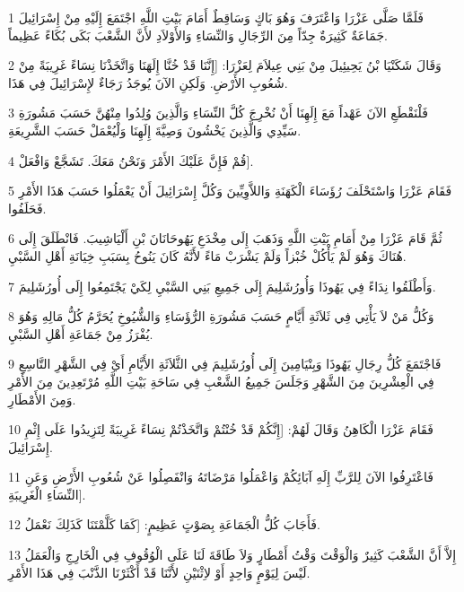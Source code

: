 \par 1 فَلَمَّا صَلَّى عَزْرَا وَاعْتَرَفَ وَهُوَ بَاكٍ وَسَاقِطٌ أَمَامَ بَيْتِ اللَّهِ اجْتَمَعَ إِلَيْهِ مِنْ إِسْرَائِيلَ جَمَاعَةٌ كَثِيرَةٌ جِدّاً مِنَ الرِّجَالِ وَالنِّسَاءِ وَالأَوْلاَدِ لأَنَّ الشَّعْبَ بَكَى بُكَاءً عَظِيماً.
\par 2 وَقَالَ شَكَنْيَا بْنُ يَحِيئِيلَ مِنْ بَنِي عِيلاَمَ لِعَزْرَا: [إِنَّنَا قَدْ خُنَّا إِلَهَنَا وَاتَّخَذْنَا نِسَاءً غَرِيبَةً مِنْ شُعُوبِ الأَرْضِ. وَلَكِنِ الآنَ يُوجَدُ رَجَاءٌ لإِسْرَائِيلَ فِي هَذَا.
\par 3 فَلْنَقْطَعِ الآنَ عَهْداً مَعَ إِلَهِنَا أَنْ نُخْرِجَ كُلَّ النِّسَاءِ وَالَّذِينَ وُلِدُوا مِنْهُنَّ حَسَبَ مَشُورَةِ سَيِّدِي وَالَّذِينَ يَخْشُونَ وَصِيَّةَ إِلَهِنَا وَلْيُعْمَلْ حَسَبَ الشَّرِيعَةِ.
\par 4 قُمْ فَإِنَّ عَلَيْكَ الأَمْرَ وَنَحْنُ مَعَكَ. تَشَجَّعْ وَافْعَلْ].
\par 5 فَقَامَ عَزْرَا وَاسْتَحْلَفَ رُؤَسَاءَ الْكَهَنَةِ وَاللاَّوِيِّينَ وَكُلَّ إِسْرَائِيلَ أَنْ يَعْمَلُوا حَسَبَ هَذَا الأَمْرِ فَحَلَفُوا.
\par 6 ثُمَّ قَامَ عَزْرَا مِنْ أَمَامِ بَيْتِ اللَّهِ وَذَهَبَ إِلَى مِخْدَعِ يَهُوحَانَانَ بْنِ أَلْيَاشِيبَ. فَانْطَلَقَ إِلَى هُنَاكَ وَهُوَ لَمْ يَأْكُلْ خُبْزاً وَلَمْ يَشْرَبْ مَاءً لأَنَّهُ كَانَ يَنُوحُ بِسَبَبِ خِيَانَةِ أَهْلِ السَّبْيِ.
\par 7 وَأَطْلَقُوا نِدَاءً فِي يَهُوذَا وَأُورُشَلِيمَ إِلَى جَمِيعِ بَنِي السَّبْيِ لِكَيْ يَجْتَمِعُوا إِلَى أُورُشَلِيمَ.
\par 8 وَكُلُّ مَنْ لاَ يَأْتِي فِي ثَلاَثَةِ أَيَّامٍ حَسَبَ مَشُورَةِ الرُّؤَسَاءِ وَالشُّيُوخِ يُحَرَّمُ كُلُّ مَالِهِ وَهُوَ يُفْرَزُ مِنْ جَمَاعَةِ أَهْلِ السَّبْيِ.
\par 9 فَاجْتَمَعَ كُلُّ رِجَالِ يَهُوذَا وَبِنْيَامِينَ إِلَى أُورُشَلِيمَ فِي الثَّلاَثَةِ الأَيَّامِ أَيْ فِي الشَّهْرِ التَّاسِعِ فِي الْعِشْرِينَ مِنَ الشَّهْرِ وَجَلَسَ جَمِيعُ الشَّعْبِ فِي سَاحَةِ بَيْتِ اللَّهِ مُرْتَعِدِينَ مِنَ الأَمْرِ وَمِنَ الأَمْطَارِ.
\par 10 فَقَامَ عَزْرَا الْكَاهِنُ وَقَالَ لَهُمْ: [إِنَّكُمْ قَدْ خُنْتُمْ وَاتَّخَذْتُمْ نِسَاءً غَرِيبَةً لِتَزِيدُوا عَلَى إِثْمِ إِسْرَائِيلَ.
\par 11 فَاعْتَرِفُوا الآنَ لِلرَّبِّ إِلَهِ آبَائِكُمْ وَاعْمَلُوا مَرْضَاتَهُ وَانْفَصِلُوا عَنْ شُعُوبِ الأَرْضِ وَعَنِ النِّسَاءِ الْغَرِيبَةِ].
\par 12 فَأَجَابَ كُلُّ الْجَمَاعَةِ بِصَوْتٍ عَظِيمٍ: [كَمَا كَلَّمْتَنَا كَذَلِكَ نَعْمَلُ.
\par 13 إِلاَّ أَنَّ الشَّعْبَ كَثِيرٌ وَالْوَقْتَ وَقْتُ أَمْطَارٍ وَلاَ طَاقَةَ لَنَا عَلَى الْوُقُوفِ فِي الْخَارِجِ وَالْعَمَلُ لَيْسَ لِيَوْمٍ وَاحِدٍ أَوْ لاِثْنَيْنِ لأَنَّنَا قَدْ أَكْثَرْنَا الذَّنْبَ فِي هَذَا الأَمْرِ.
